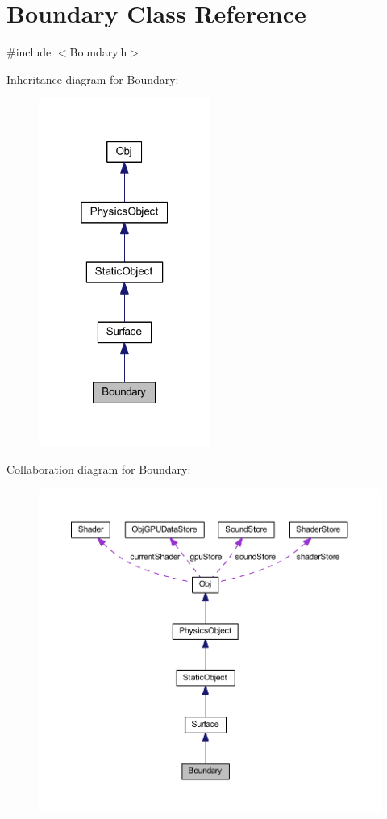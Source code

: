 \hypertarget{class_boundary}{}\section{Boundary Class Reference}
\label{class_boundary}


{\ttfamily \#include $<$Boundary.\+h$>$}



Inheritance diagram for Boundary\+:
\nopagebreak
\begin{figure}[H]
\begin{center}
\leavevmode
\includegraphics[width=160pt]{class_boundary__inherit__graph}
\end{center}
\end{figure}


Collaboration diagram for Boundary\+:
\nopagebreak
\begin{figure}[H]
\begin{center}
\leavevmode
\includegraphics[width=350pt]{class_boundary__coll__graph}
\end{center}
\end{figure}
